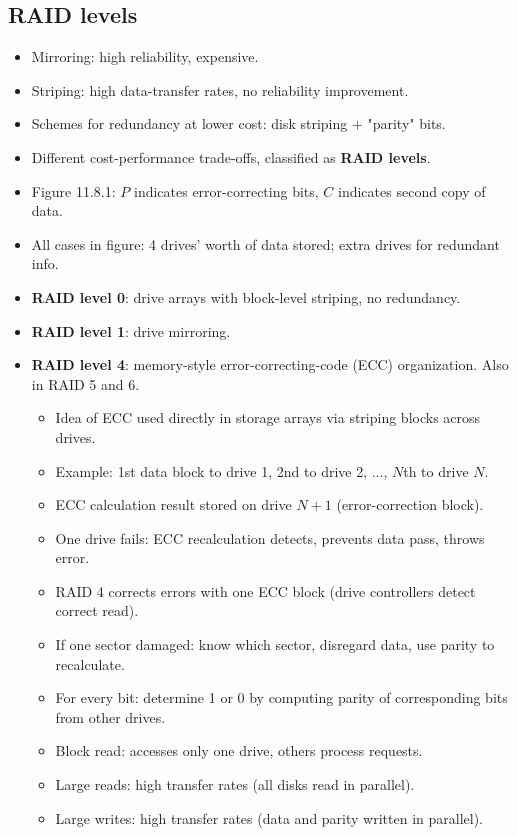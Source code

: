 \subsection{RAID levels}
\begin{itemize}
    \item Mirroring: high reliability, expensive.
    \item Striping: high data-transfer rates, no reliability improvement.
    \item Schemes for redundancy at lower cost: disk striping + "parity" bits.
    \item Different cost-performance trade-offs, classified as \textbf{RAID levels}.
    \item Figure 11.8.1: $P$ indicates error-correcting bits, $C$ indicates second copy of data.
    \item All cases in figure: 4 drives' worth of data stored; extra drives for redundant info.
    \item \textbf{RAID level 0}: drive arrays with block-level striping, no redundancy.
    \item \textbf{RAID level 1}: drive mirroring.
    \item \textbf{RAID level 4}: memory-style error-correcting-code (ECC) organization. Also in RAID 5 and 6.
    \begin{itemize}
        \item Idea of ECC used directly in storage arrays via striping blocks across drives.
        \item Example: 1st data block to drive 1, 2nd to drive 2, ..., $N$th to drive $N$.
        \item ECC calculation result stored on drive $N+1$ (error-correction block).
        \item One drive fails: ECC recalculation detects, prevents data pass, throws error.
        \item RAID 4 corrects errors with one ECC block (drive controllers detect correct read).
        \item If one sector damaged: know which sector, disregard data, use parity to recalculate.
        \item For every bit: determine 1 or 0 by computing parity of corresponding bits from other drives.
        \item Block read: accesses only one drive, others process requests.
        \item Large reads: high transfer rates (all disks read in parallel).
        \item Large writes: high transfer rates (data and parity written in parallel).

\end{itemize}
\end{itemize}
